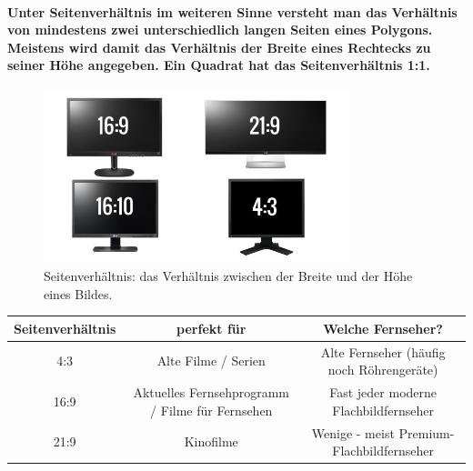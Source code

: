 \documentclass[a4paper]{article}
\begin{document}
    \paragraph{\color{codegreen} Unter Seitenverhältnis im weiteren Sinne versteht man das Verhältnis von mindestens zwei unterschiedlich langen Seiten eines Polygons. Meistens wird damit das Verhältnis der Breite eines Rechtecks zu seiner Höhe angegeben. Ein Quadrat hat das Seitenverhältnis 1:1.}
    \begin{center}
        \begin{figure}[H]
            \centering
            \includegraphics[height=5cm]{media/bs}
            \captionsetup{labelformat=empty}
            \caption{\color{red} Seitenverhältnis: das Verhältnis zwischen der Breite und der Höhe eines Bildes.}
            \label{fig:Seitenverhaeltnis}
        \end{figure}
        \begin{tabular}{|c|c|c|}
            \hline
            \textbf{Seitenverhältnis}   & \textbf{perfekt für}                                                   & \textbf{Welche Fernseher?}                                        \\ \hline
            {\color[HTML]{009901} 4:3}  & {\color[HTML]{CE6301} Alte Filme / Serien}                             & {\color[HTML]{3531FF} Alte Fernseher (häufig noch Röhrengeräte)}  \\ \hline
            {\color[HTML]{009901} 16:9} & {\color[HTML]{CE6301} Aktuelles Fernsehprogramm / Filme für Fernsehen} & {\color[HTML]{3531FF} Fast jeder moderne Flachbildfernseher}      \\ \hline
            {\color[HTML]{009901} 21:9} & {\color[HTML]{CE6301} Kinofilme}                                       & {\color[HTML]{3531FF} Wenige - meist Premium-Flachbildfernseher} \\ \hline
        \end{tabular}
    \end{center}
\end{document}
